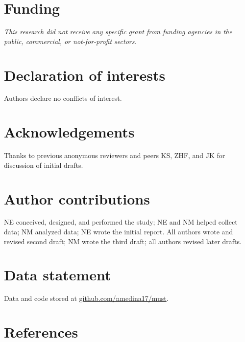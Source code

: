 \documentclass[
  12pt,
]{article}
\begin{document}
\hypertarget{funding}{%
\section*{Funding}\label{funding}}

\emph{This research did not receive any specific grant from funding agencies in the public, commercial, or not-for-profit sectors.}

\hypertarget{declaration-of-interests}{%
\section*{Declaration of interests}\label{declaration-of-interests}}

Authors declare no conflicts of interest.

\hypertarget{acknowledgements}{%
\section*{Acknowledgements}\label{acknowledgements}}

Thanks to previous anonymous reviewers and peers KS, ZHF, and JK for discussion of initial drafts.

\hypertarget{author-contributions}{%
\section*{Author contributions}\label{author-contributions}}

NE conceived, designed, and performed the study; NE and NM helped collect data; NM analyzed data; NE wrote the initial report. All authors wrote and revised second draft; NM wrote the third draft; all authors revised later drafts.

\hypertarget{data-statement}{%
\section*{Data statement}\label{data-statement}}

Data and code stored at \href{github.com/nmedin17/must}{github.com/nmedina17/must}.

\newpage

\hypertarget{references}{%
\section*{References}\label{references}}
\end{document}
